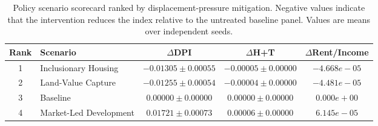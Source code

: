 \begin{table}[t]
\centering
\caption{Policy scenario scorecard ranked by displacement-pressure mitigation. Negative values indicate that the intervention reduces the index relative to the untreated baseline panel. Values are means over independent seeds.}
\label{tab:policy_scorecard}
\small
\begin{tabular}{clccc}
\toprule
\textbf{Rank} & \textbf{Scenario} & $\Delta$\textbf{DPI} & $\Delta$\textbf{H+T} & $\Delta$\textbf{Rent/Income} \\
\midrule
1 & Inclusionary Housing & $-0.01305 \pm 0.00055$ & $-0.00005 \pm 0.00000$ & $-4.668e-05$ \\
2 & Land-Value Capture & $-0.01255 \pm 0.00054$ & $-0.00004 \pm 0.00000$ & $-4.481e-05$ \\
3 & Baseline & $0.00000 \pm 0.00000$ & $0.00000 \pm 0.00000$ & $0.000e+00$ \\
4 & Market-Led Development & $0.01721 \pm 0.00073$ & $0.00006 \pm 0.00000$ & $6.145e-05$ \\
\bottomrule
\end{tabular}
\end{table}
